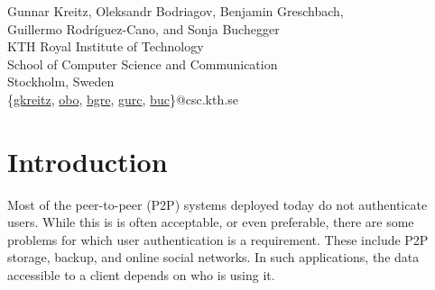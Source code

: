 % 





\begin{center}
Gunnar Kreitz, Oleksandr Bodriagov, Benjamin Greschbach,\\
Guillermo Rodr\'{i}guez-Cano, and Sonja Buchegger\\[2em]

KTH Royal Institute of Technology\\
School of Computer Science and Communication\\
Stockholm, Sweden\\
\{\href{gkreitz@csc.kth.se}{gkreitz}, \href{obo@csc.kth.se}{obo}, 
\href{bgre@csc.kth.se}{bgre}, \href{gurc@csc.kth.se}{gurc}, \href{buc@csc.kth.se}{buc}\}@csc.kth.se
\end{center}


\begin{abstract}
    
\end{abstract}

\clearpage
\section{Introduction}

Most of the peer-to-peer (P2P) systems deployed today do not authenticate
users. While this is is often acceptable, or even preferable, there are some
problems for which user authentication is a requirement. These include P2P
storage, backup, and online social networks. In such applications, the data
accessible to a client depends on who is using it.

